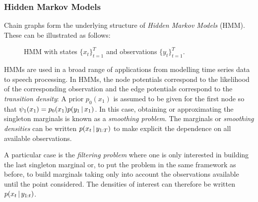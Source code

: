 \subsubsection{Hidden Markov Models}
Chain graphs form the underlying structure of \emph{Hidden Markov Models} (HMM). These can be illustrated as follows:
\begin{figure}[!h]
\center
{}
\caption{\label{fig: hmm1} HMM with states $\{x_{t}\}_{t=1}^{T}$ and observations $\{y_{t}\}_{t=1}^{T}$.}
\end{figure}

HMMs are used in a broad range of applications from modelling time series data to speech processing. In HMMs, the node potentials correspond to the likelihood of the corresponding observation and the edge potentials correspond to the \emph{transition density}:
A prior $p_{0}(x_{1})$ is assumed to be given for the first node so that $\psi_1(x_1) = p_{0}(x_1)p(y_1\,|\, x_1)$. In this case, obtaining or approximating the singleton marginals is known as a \emph{smoothing problem}. The marginals or \emph{smoothing densities} can be written $p(x_t\,|\, y_{1:T})$ to make explicit the dependence on all available observations.

A particular case is the \emph{filtering problem} where one is only interested in building the last singleton marginal or, to put the problem in the same framework as before, to build marginals taking only into account the observations available until the point considered. The densities of interest can therefore be written $p(x_t\,|\, y_{1:t})$.

